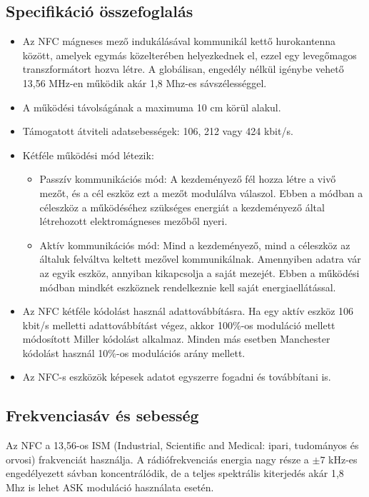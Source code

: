 \documentclass[12pt]{article}
\begin{document}
\subsection{Specifikáció összefoglalás}
\begin{itemize}
\item Az NFC mágneses mező indukálásával kommunikál kettő hurokantenna között,
amelyek egymás közelterében  helyezkednek el, ezzel egy levegőmagos
transzformátort hozva létre. A globálisan, engedély nélkül igénybe vehető 
13,56 MHz-en működik akár 1,8 Mhz-es sávszélességgel.
\item A működési távolságának a maximuma 10 cm körül alakul.
\item Támogatott átviteli adatsebességek: 106, 212 vagy 424 kbit/s.
\item Kétféle működési mód létezik:
\begin{itemize}
\item Passzív kommunikációs mód: A kezdeményező fél hozza létre a vivő mezőt, és a
cél eszköz ezt a mezőt modulálva válaszol. Ebben a módban a céleszköz a 
működéséhez szükséges energiát a kezdeményező által létrehozott elektromágneses
mezőből nyeri.
\item Aktív kommunikációs mód: Mind a kezdeményező, mind a céleszköz az általuk
felváltva keltett mezővel kommunikálnak. Amennyiben adatra vár az egyik eszköz,
annyiban kikapcsolja a saját mezejét. Ebben a működési módban mindkét eszköznek
rendelkeznie kell saját energiaellátással.
\end{itemize}
\item Az NFC kétféle kódolást használ adattovábbításra. Ha egy aktív eszköz 
106 kbit/s melletti adattovábbítást végez, akkor 100\%-os moduláció mellett
módosított Miller kódolást alkalmaz. Minden más esetben Manchester kódolást
használ 10\%-os modulációs arány mellett.
\item Az NFC-s eszközök képesek adatot egyszerre fogadni és továbbítani is. 
\end{itemize}

\subsection{Frekvenciasáv és sebesség}
Az NFC a 13,56-os ISM (Industrial, Scientific and Medical: ipari, tudományos
és orvosi) frakvenciát használja. A rádiófrekvenciás energia nagy része a 
$\pm 7$ kHz-es engedélyezett sávban koncentrálódik, de a teljes spektrális 
kiterjedés akár 1,8 Mhz is lehet ASK moduláció használata esetén.
\end{document}
